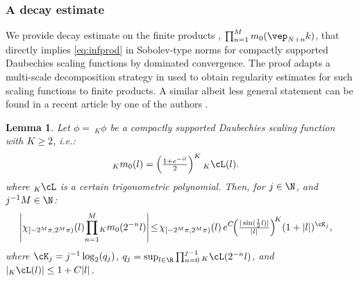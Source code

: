 \documentclass[a4paper, 11pt]{article}
\DeclareMathOperator{\1}{\mathds{1}}
\newtheorem{lemma}[thm]{Lemma}
\begin{document}
\subsubsection{A decay estimate}
\label{sec:convergence}
We provide decay estimate on the finite products , $\prod_{n=1}^{M}m_{0}(\vep_{N+n}k)$, that directly implies \eqref{eq:infprod} in Sobolev-type norms for compactly supported Daubechies scaling functions by dominated convergence. The proof adapts a multi-scale decomposition strategy in \cite{DaubechiesTenLecturesOn} used to obtain regularity estimates for such scaling functions to finite products. A similar albeit less general statement can be found in a recent article by one of the authors \cite{MorinelliScalingLimitsOf}.

\begin{lemma}
\label{lem:convergence}
Let $\phi =\!\ _{K}\phi$ be a compactly supported Daubechies scaling function with $K\geq2$, i.e.:
\begin{align}
\label{eq:m0factor}
_{K}m_{0}(l) & = \left(\tfrac{1+e^{-il}}{2}\right)^{K} {}_{K}\cL(l).
\end{align}
where ${}_{K}\cL$ is a certain trigonometric polynomial. Then, for $j\in\N$, and $j^{-1}M\in\N$:
\begin{align}
\label{eq:convergence}
\left|\chi_{[-2^{M}\pi,2^{M}\pi)}(l)\!\prod_{n=1}^{M}\!{}_{K}m_{0}(2^{-n}l)\right| & \!\leq\!\chi_{[-2^{M}\pi,2^{M}\pi)}(l)\!\ e^{C}\!\!\left(\tfrac{|\sin(\frac{1}{2}l)|}{|l|}\right)^{\!K}\!(1+|l|)^{\cK_{j}},
\end{align}
where $\cK_{j} = j^{-1}\log_{2}(q_{j})$, $q_{j}=\sup_{l\in\R}\prod_{n=0}^{j-1}{}_{K}\cL(2^{-n}l)$, and $|{}_{K}\cL(l)|\leq 1+C|l|$.
\end{lemma}
\end{document}
